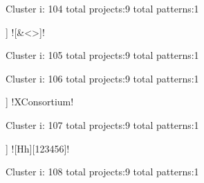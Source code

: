 Cluster i: 104
total projects:9
total patterns:1
\begin{multicols}{1}
\begin{description}[noitemsep,topsep=0pt]
\item [[9] ] \cverb![\n@{}&<>]!
\end{description}
\end{multicols}







Cluster i: 105
total projects:9
total patterns:1
\begin{multicols}{1}
\begin{description}[noitemsep,topsep=0pt]
\item [[9] ] \cverb!([0-9.]+)$!
\end{description}
\end{multicols}







Cluster i: 106
total projects:9
total patterns:1
\begin{multicols}{1}
\begin{description}[noitemsep,topsep=0pt]
\item [[9] ] \cverb!XConsortium!
\end{description}
\end{multicols}







Cluster i: 107
total projects:9
total patterns:1
\begin{multicols}{1}
\begin{description}[noitemsep,topsep=0pt]
\item [[9] ] \cverb![Hh][123456]!
\end{description}
\end{multicols}







Cluster i: 108
total projects:9
total patterns:1
\begin{multicols}{1}
\begin{description}[noitemsep,topsep=0pt]
\item [[9] ] \cverb!^(@[a-z]+)?{!
\end{description}
\end{multicols}







